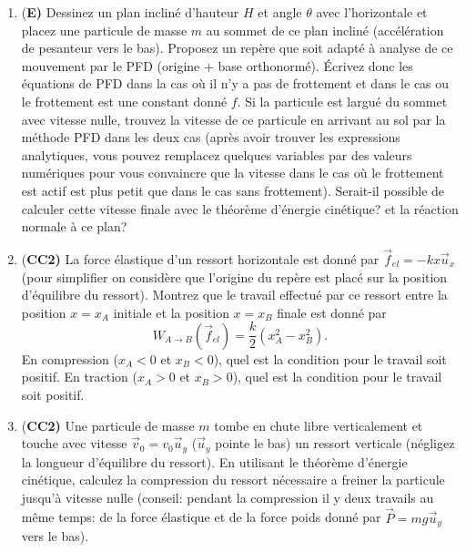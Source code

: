 \documentclass[french,12pt]{article}
\begin{document}
\begin{enumerate}
\item {(\bf E)} Dessinez un plan incliné d'hauteur $H$ et angle $\theta$ avec l'horizontale et placez une particule de masse $m$ au sommet de ce plan incliné (accélération de pesanteur vers le bas). Proposez un repère que soit adapté à analyse de ce mouvement par le PFD (origine + base orthonormé). Écrivez donc les équations de PFD dans la cas où il n'y a pas de frottement et dans le cas ou le frottement est une constant donné $f$. Si la particule est largué du sommet avec vitesse nulle, trouvez la vitesse de ce particule en arrivant au sol par la méthode PFD dans les deux cas (après avoir trouver les expressions analytiques, vous pouvez remplacez quelques variables par des valeurs numériques pour vous convaincre que la vitesse dans le cas où le frottement est actif est plus petit que dans le cas sans frottement). Serait-il possible de calculer cette vitesse finale avec le théorème d'énergie cinétique? et la réaction normale à ce plan?

\item {(\bf CC2)} La force élastique d'un ressort horizontale est donné par $\vec{f}_{el} = -k x \vec{u}_x$ (pour simplifier on considère que l'origine du repère est placé sur la position d'équilibre du ressort). Montrez que le travail effectué par ce ressort entre la position $x=x_A$ initiale et la position $x=x_B$ finale est donné par 
$$
W_{A\to B}(\vec{f}_{el}) = \frac{k}{2}(x_A^2 - x_B^2).
$$
En compression ($x_A<0$ et $x_B<0$), quel est la condition pour le travail soit positif. En traction ($x_A>0$ et $x_B>0$), quel est la condition pour le travail soit positif.

\item {(\bf CC2)} Une particule de masse $m$ tombe en chute libre verticalement et touche avec vitesse $\vec{v}_0 = v_0 \vec{u}_y$ ($\vec{u}_y$ pointe le bas) un ressort verticale (négligez la longueur d'équilibre du ressort). En utilisant le théorème d'énergie cinétique, calculez la compression du ressort nécessaire a freiner la particule jusqu'à vitesse nulle (conseil: pendant la compression il y deux travails au même temps: de la force élastique et de la force poids donné par $\vec{P} = m g \vec{u}_y $ vers le bas).


\end{enumerate}
\end{document}
